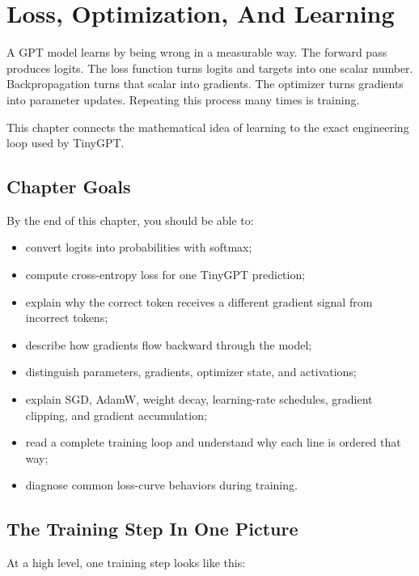 \chapter{Loss, Optimization, And Learning}

A GPT model learns by being wrong in a measurable way. The forward pass produces logits. The loss function turns logits and targets into one scalar number. Backpropagation turns that scalar into gradients. The optimizer turns gradients into parameter updates. Repeating this process many times is training.

This chapter connects the mathematical idea of learning to the exact engineering loop used by TinyGPT.

\section{Chapter Goals}

By the end of this chapter, you should be able to:

\begin{itemize}
  \item convert logits into probabilities with softmax;
  \item compute cross-entropy loss for one TinyGPT prediction;
  \item explain why the correct token receives a different gradient signal from incorrect tokens;
  \item describe how gradients flow backward through the model;
  \item distinguish parameters, gradients, optimizer state, and activations;
  \item explain SGD, AdamW, weight decay, learning-rate schedules, gradient clipping, and gradient accumulation;
  \item read a complete training loop and understand why each line is ordered that way;
  \item diagnose common loss-curve behaviors during training.
\end{itemize}

\section{The Training Step In One Picture}

At a high level, one training step looks like this:

